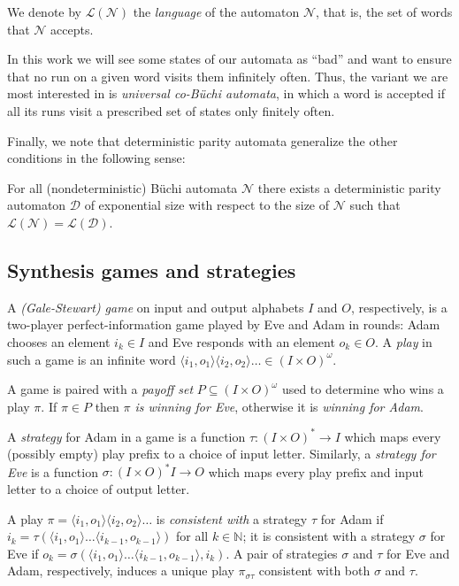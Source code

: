 \documentclass[runningheads,a4paper,draft]{llncs}
\newcommand{\eve}{Eve\xspace}
\newcommand{\adam}{Adam\xspace}
\newcommand{\calN}{\mathcal{N}}
\newcommand{\calD}{\mathcal{D}}
\newcommand{\lang}[1]{\mathcal{L}({#1})}
\newcommand{\out}[2]{\pi_{#1#2}}
\begin{document}
We denote by $\lang{\calN}$ the \emph{language} of the automaton $\calN$, that
is, the set of words that $\calN$ accepts.

In this work we will see some states of our automata as ``bad'' and want to
ensure that no run on a given word visits them infinitely often.  Thus, the
variant we are most interested in is \emph{universal co-Büchi automata}, in
which a word is accepted if all its runs visit a prescribed set of states only
finitely often.

Finally, we note that deterministic parity automata generalize the other
conditions in the following sense:
\begin{proposition}\label{prop:paritymr}
  For all (nondeterministic) B\"uchi automata $\calN$ there exists a
  deterministic parity automaton $\calD$ of exponential size with respect to the
  size of $\calN$ such that $\lang{\calN} = \lang{\calD}$.
\end{proposition}

\subsection{Synthesis games and strategies}
\begin{definition}[Games]
  A \emph{(Gale-Stewart) game} on input and output alphabets $I$ and $O$,
  respectively, is a two-player perfect-information game played by \eve and
  \adam in rounds: \adam chooses an element $i_k \in I$ and \eve responds with
  an element $o_k \in O$. A \emph{play} in such a game is an infinite word
  $\langle i_1, o_1\rangle \langle i_2, o_2\rangle \dots \in (I\times O)^\omega$. 
\end{definition}
A game is paired with a \emph{payoff set} $P \subseteq (I \times
O)^\omega$ used to determine who wins a play $\pi$. If $\pi \in P$ then
\emph{$\pi$ is winning for \eve}, otherwise it is \emph{winning for \adam}.

\begin{definition}[Strategies]
  A \emph{strategy} for \adam in a game is a function $\tau\colon (I \times O)^*
  \to I$ which maps every (possibly empty) play prefix
  to a choice of input letter.  Similarly, a \emph{strategy for \eve}
  is a function $\sigma\colon (I \times O)^* I \to O$ which maps every play prefix
  and input letter to a choice of output letter.
\end{definition}
A play $\pi = \langle i_1, o_1\rangle \langle i_2, o_2\rangle \dots$ is
\emph{consistent with} a strategy $\tau$ for \adam if $i_k = \tau( \langle
i_1, o_1\rangle \dots \langle i_{k-1}, o_{k-1}\rangle)$ for all $k \in
\mathbb{N}$; it is consistent with a strategy $\sigma$ for \eve if $o_k =
\sigma( \langle i_1, o_1\rangle \dots \langle i_{k-1}, o_{k-1}\rangle,
i_{k})$.  A pair of strategies $\sigma$ and $\tau$ for \eve and \adam,
respectively, induces a unique play $\out{\sigma}{\tau}$ consistent with both
$\sigma$ and $\tau$.
\end{document}
